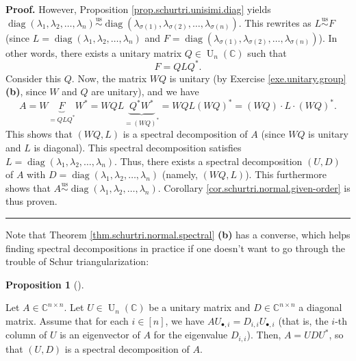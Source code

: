 \documentclass[numbers=enddot,12pt,final,onecolumn,notitlepage]{scrartcl}%
\numberwithin{exer}{subsection}
\theoremstyle{definition}
\newtheorem{prop}[theo]{Proposition}
\newenvironment{proposition}[1][]
{\begin{prop}[#1]\begin{leftbar}}
{\end{leftbar}\end{prop}}
\newenvironment{proof}[1][Proof]{\noindent\textbf{#1.} }{\ \rule{0.5em}{0.5em}}
\begin{document}
\begin{proof}
However, Proposition \ref{prop.schurtri.unisimi.diag} yields
$\operatorname*{diag}\left(  \lambda_{1},\lambda_{2},\ldots,\lambda
_{n}\right)  \overset{\operatorname*{us}}{\sim}\operatorname*{diag}\left(
\lambda_{\sigma\left(  1\right)  },\lambda_{\sigma\left(  2\right)  }%
,\ldots,\lambda_{\sigma\left(  n\right)  }\right)  $. This rewrites as
$L\overset{\operatorname*{us}}{\sim}F$ (since $L=\operatorname*{diag}\left(
\lambda_{1},\lambda_{2},\ldots,\lambda_{n}\right)  $ and
$F=\operatorname*{diag}\left(  \lambda_{\sigma\left(  1\right)  }%
,\lambda_{\sigma\left(  2\right)  },\ldots,\lambda_{\sigma\left(  n\right)
}\right)  $). In other words, there exists a unitary matrix $Q\in
\operatorname*{U}\nolimits_{n}\left(  \mathbb{C}\right)  $ such that%
\[
F=QLQ^{\ast}.
\]
Consider this $Q$. Now, the matrix $WQ$ is unitary (by Exercise
\ref{exe.unitary.group} \textbf{(b)}, since $W$ and $Q$ are unitary), and we
have%
\[
A=W\underbrace{F}_{=QLQ^{\ast}}W^{\ast}=WQL\underbrace{Q^{\ast}W^{\ast}%
}_{=\left(  WQ\right)  ^{\ast}}=WQL\left(  WQ\right)  ^{\ast}=\left(
WQ\right)  \cdot L\cdot\left(  WQ\right)  ^{\ast}.
\]
This shows that $\left(  WQ,L\right)  $ is a spectral decomposition of $A$
(since $WQ$ is unitary and $L$ is diagonal). This spectral decomposition
satisfies $L=\operatorname*{diag}\left(  \lambda_{1},\lambda_{2}%
,\ldots,\lambda_{n}\right)  $. Thus, there exists a spectral decomposition
$\left(  U,D\right)  $ of $A$ with $D=\operatorname*{diag}\left(  \lambda
_{1},\lambda_{2},\ldots,\lambda_{n}\right)  $ (namely, $\left(  WQ,L\right)
$). This furthermore shows that $A\overset{\operatorname*{us}}{\sim
}\operatorname*{diag}\left(  \lambda_{1},\lambda_{2},\ldots,\lambda
_{n}\right)  $. Corollary \ref{cor.schurtri.normal.given-order} is thus proven.
\end{proof}

Note that Theorem \ref{thm.schurtri.normal.spectral} \textbf{(b)} has a
converse, which helps finding spectral decompositions in practice if one
doesn't want to go through the trouble of Schur triangularization:

\begin{proposition}
\label{prop.schurtri.normal.converse}Let $A\in\mathbb{C}^{n\times n}$. Let
$U\in\operatorname*{U}\nolimits_{n}\left(  \mathbb{C}\right)  $ be a unitary
matrix and $D\in\mathbb{C}^{n\times n}$ a diagonal matrix. Assume that for
each $i\in\left[  n\right]  $, we have $AU_{\bullet,i}=D_{i,i}U_{\bullet,i}$
(that is, the $i$-th column of $U$ is an eigenvector of $A$ for the eigenvalue
$D_{i,i}$). Then, $A=UDU^{\ast}$, so that $\left(  U,D\right)  $ is a spectral
decomposition of $A$.
\end{proposition}
\end{document}
